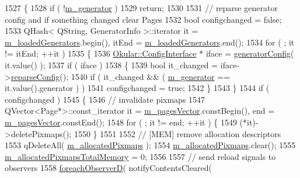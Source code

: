 \begin{DoxyCode}
1527 \{
1528     \textcolor{keywordflow}{if} ( !\hyperlink{classOkular_1_1DocumentPrivate_a52083f79ce95756ddea060e74315e91f}{m\_generator} )
1529         \textcolor{keywordflow}{return};
1530 
1531     \textcolor{comment}{// reparse generator config and if something changed clear Pages}
1532     \textcolor{keywordtype}{bool} configchanged = \textcolor{keyword}{false};
1533     QHash< QString, GeneratorInfo >::iterator it = \hyperlink{classOkular_1_1DocumentPrivate_a449d3ae52e95d649dba62225f20a4195}{m\_loadedGenerators}.begin(), itEnd = 
      \hyperlink{classOkular_1_1DocumentPrivate_a449d3ae52e95d649dba62225f20a4195}{m\_loadedGenerators}.end();
1534     \textcolor{keywordflow}{for} ( ; it != itEnd; ++it )
1535     \{
1536         \hyperlink{classOkular_1_1ConfigInterface}{Okular::ConfigInterface} * iface = \hyperlink{classOkular_1_1DocumentPrivate_ac40c31099a6fd5d842ae94e5557b9700}{generatorConfig}( it.value()
       );
1537         \textcolor{keywordflow}{if} ( iface )
1538         \{
1539             \textcolor{keywordtype}{bool} it\_changed = iface->\hyperlink{classOkular_1_1ConfigInterface_a0f61ec6852e483b898efd9709b1ef63b}{reparseConfig}();
1540             \textcolor{keywordflow}{if} ( it\_changed && ( \hyperlink{classOkular_1_1DocumentPrivate_a52083f79ce95756ddea060e74315e91f}{m\_generator} == it.value().generator ) )
1541                 configchanged = \textcolor{keyword}{true};
1542         \}
1543     \}
1544     \textcolor{keywordflow}{if} ( configchanged )
1545     \{
1546         \textcolor{comment}{// invalidate pixmaps}
1547         QVector<Page*>::const\_iterator it = \hyperlink{classOkular_1_1DocumentPrivate_a73b852d9a73ffe8061b66dbf9b290f17}{m\_pagesVector}.constBegin(), end = 
      \hyperlink{classOkular_1_1DocumentPrivate_a73b852d9a73ffe8061b66dbf9b290f17}{m\_pagesVector}.constEnd();
1548         \textcolor{keywordflow}{for} ( ; it != end; ++it ) \{
1549             (*it)->deletePixmaps();
1550         \}
1551 
1552         \textcolor{comment}{// [MEM] remove allocation descriptors}
1553         qDeleteAll( \hyperlink{classOkular_1_1DocumentPrivate_a13e55dcfc91cfbe1ff91a55312f3e39f}{m\_allocatedPixmaps} );
1554         \hyperlink{classOkular_1_1DocumentPrivate_a13e55dcfc91cfbe1ff91a55312f3e39f}{m\_allocatedPixmaps}.clear();
1555         \hyperlink{classOkular_1_1DocumentPrivate_accbd72ead7fca72852b516f580d2abf1}{m\_allocatedPixmapsTotalMemory} = 0;
1556 
1557         \textcolor{comment}{// send reload signals to observers}
1558         \hyperlink{core_2document_8cpp_a213572010703f4fcbc3229b09d665d3c}{foreachObserverD}( notifyContentsCleared( 

\end{DoxyCode}
